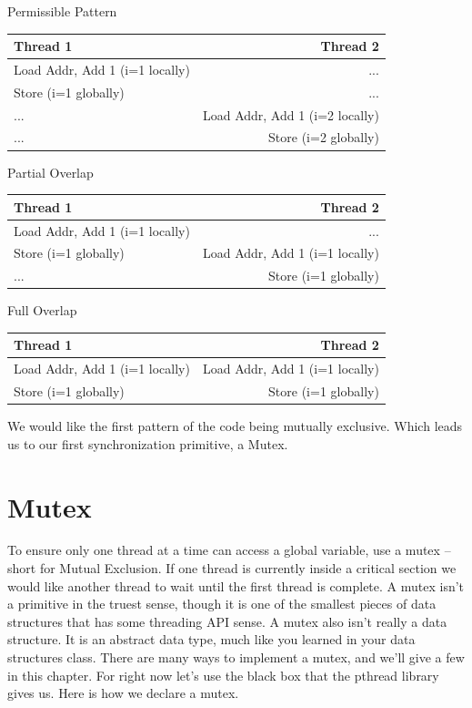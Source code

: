 Permissible Pattern

\begin{tabular}{ l | r }
  Thread 1 & Thread 2 \\ \hline
  Load Addr, Add 1 (i=1 locally) & ...  \\
  Store (i=1 globally) & ...  \\
  ... & Load Addr, Add 1 (i=2 locally)  \\
  ... & Store (i=2 globally)  \\
\end{tabular}

Partial Overlap

\begin{tabular}{ l | r }
Thread 1 & Thread 2 \\ \hline
Load Addr, Add 1 (i=1 locally) & ... \\
Store (i=1 globally) & Load Addr, Add 1 (i=1 locally) \\
... & Store (i=1 globally) \\
\end{tabular}

Full Overlap
\begin{tabular}{ l | r }
Thread 1 & Thread 2 \\ \hline
Load Addr, Add 1 (i=1 locally) & Load Addr, Add 1 (i=1 locally) \\
Store (i=1 globally) & Store (i=1 globally) \\
\end{tabular}

We would like the first pattern of the code being mutually exclusive.
Which leads us to our first synchronization primitive, a Mutex.

\section{Mutex}

To ensure only one thread at a time can access a global variable, use a mutex -- short for Mutual Exclusion.
If one thread is currently inside a critical section we would like another thread to wait until the first thread is complete.
A mutex isn't a primitive in the truest sense, though it is one of the smallest pieces of data structures that has some threading API sense.
A mutex also isn't really a data structure.
It is an abstract data type, much like you learned in your data structures class.
There are many ways to implement a mutex, and we'll give a few in this chapter.
For right now let's use the black box that the pthread library gives us.
Here is how we declare a mutex.

